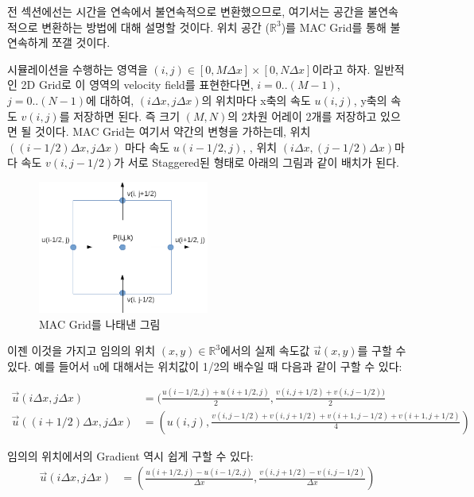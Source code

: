\documentclass[11pt, A4]{article}
\begin{document}
전 섹션에선는 시간을 연속에서 불연속적으로 변환했으므로, 여기서는 공간을 불연속적으로 변환하는 방법에 대해 설명할 것이다. 위치 공간 ($\mathbb{R}^3$)를 MAC Grid를 통해 불연속하게 쪼갤 것이다. \cite[p.21-25]{fluid-sim-cg}

시뮬레이션을 수행하는 영역을 $(i, j) \in [0, M \Delta x] \times [0, N \Delta x]$이라고 하자. 일반적인 2D Grid로 이 영역의 velocity field를 표현한다면, $i = 0..(M-1)$, $j = 0..(N-1)$에 대하여,  $(i \Delta x, j \Delta x)$의 위치마다 x축의 속도 $u(i, j)$, y축의 속도 $v(i, j)$를 저장하면 된다. 즉 크기 $(M, N)$의 2차원 어레이 2개를 저장하고 있으면 될 것이다. MAC Grid는 여기서 약간의 변형을 가하는데, 위치 $((i-1/2) \Delta x, j \Delta x)$ 마다 속도 $u(i-1/2, j)$, , 위치 $(i \Delta x, (j-1/2) \Delta x)$마다 속도 $v(i,j-1/2)$가 서로 Staggered된 형태로 아래의 그림과 같이 배치가 된다.

\begin{figure}[h]
\centering
\includegraphics[width=0.5\textwidth]{mac_grid}
\caption{MAC Grid를 나태낸 그림}
\end{figure}

이젠 이것을 가지고 임의의 위치 $(x, y) \in \mathbb{R}^3$에서의 실제 속도값 $\vec{u}(x, y)$를 구할 수 있다. 예를 들어서 u에 대해서는 위치값이 1/2의 배수일 때 다음과 같이 구할 수 있다:

\begin{align*} 
  \vec{u}(i \Delta x, j \Delta x) &= (\frac{u(i-1/2, j) + u(i+1/2, j)}{2}, \frac{v(i,j+1/2) + v(i,j-1/2))}{2} \\
  \vec{u}((i+1/2) \Delta x, j \Delta x) &= (u(i,j), \frac{v(i,j-1/2) + v(i,j+1/2) + v(i+1,j-1/2) + v(i+1,j+1/2)}{4})
\end{align*}

임의의 위치에서의 Gradient 역시 쉽게 구할 수 있다:
\begin{align*}
  \vec{u}(i \Delta x, j \Delta x) &= (\frac{u(i+1/2, j) - u(i-1/2, j)}{\Delta x}, \frac{v(i,j+1/2) - v(i,j-1/2)}{\Delta x})
\end{align*}
\end{document}
